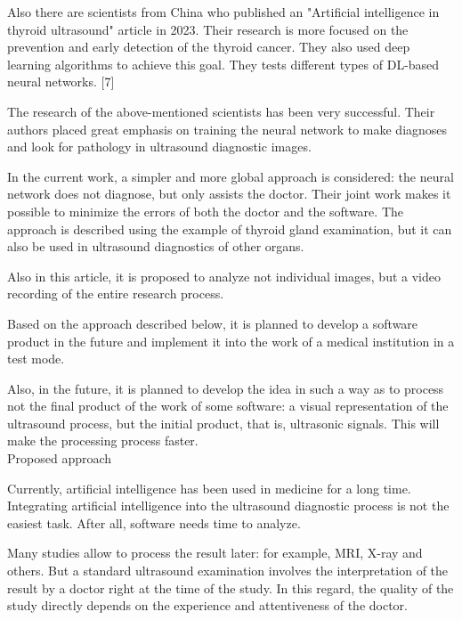 \documentclass{article}
\newcommand{\RomanNumeralCaps}[1]
    {\MakeUppercase{\romannumeral #1}}
\begin{document}
\par Also there are scientists from China who published an
"Artificial intelligence in thyroid ultrasound" article in
2023. Their research is more focused on the prevention
and early detection of the thyroid cancer. They also used
deep learning algorithms to achieve this goal. They tests
different types of DL-based neural networks. [7]

\par The research of the above-mentioned scientists has
been very successful. Their authors placed great emphasis on training the neural network to make diagnoses and
look for pathology in ultrasound diagnostic images.

\par In the current work, a simpler and more global
approach is considered: the neural network does not
diagnose, but only assists the doctor. Their joint work
makes it possible to minimize the errors of both the
doctor and the software. The approach is described using
the example of thyroid gland examination, but it can also
be used in ultrasound diagnostics of other organs.

\par Also in this article, it is proposed to analyze not
individual images, but a video recording of the entire
research process.

\par Based on the approach described below, it is planned
to develop a software product in the future and implement
it into the work of a medical institution in a test mode.

\par Also, in the future, it is planned to develop the idea
in such a way as to process not the final product of
the work of some software: a visual representation of
the ultrasound process, but the initial product, that is,
ultrasonic signals. This will make the processing process
faster.\\

\RomanNumeralCaps{5} Proposed approach

\vspace{0mm} %

\par Currently, artificial intelligence has been used in medicine for a long time. Integrating artificial intelligence into the ultrasound diagnostic process is not the easiest task. After all, software needs time to analyze.

\par Many studies allow to process the result later: for example, MRI, X-ray and others. But a standard ultrasound
examination involves the interpretation of the result by a
doctor right at the time of the study. In this regard, the
quality of the study directly depends on the experience
and attentiveness of the doctor.
\end{document}
